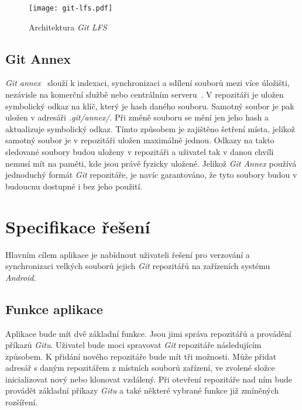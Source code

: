 \begin{figure}[h!]
    \begin{minipage}{\textwidth}
    \centering
    \vspace{0.5cm}
    \texttt{[image: git-lfs.pdf]}
    \caption{Architektura \emph{Git LFS}~\cite{git-lfs}}
    \label{diagram:git-lfs}
    \end{minipage}
\end{figure}

\section{Git Annex}
\emph{Git annex}~\cite{git-annex} slouží k indexaci, synchronizaci a sdílení souborů mezi více úložišti, nezávisle na komerční službě nebo centrálním serveru~\cite{wiki-git-annex}. V repozitáři je uložen symbolický odkaz na klíč, který je hash daného souboru. Samotný soubor je pak uložen v adresáři \emph{.git/annex/}. Při změně souboru se mění jen jeho hash a aktualizuje symbolický odkaz. Tímto způsobem je zajištěno šetření místa, jelikož samotný soubor je v repozitáři uložen maximálně jednou. Odkazy na takto sledované soubory budou uloženy v repozitáři a uživatel tak v danou chvíli nemusí mít na paměti, kde jsou právě fyzicky uložené. Jelikož \emph{Git Annex} používá jednoduchý formát \emph{Git} repozitáře, je navíc garantováno, že tyto soubory budou v budoucnu dostupné i bez jeho použití.

\chapter{Specifikace řešení}
Hlavním cílem aplikace je nabídnout uživateli řešení pro verzování a synchronizaci velkých souborů jejich \emph{Git} repozitářů na zařízeních systému \emph{Android}.

\section{Funkce aplikace}
Aplikace bude mít dvě základní funkce. Jsou jimi správa repozitářů a provádění příkazů \emph{Gitu}. Uživatel bude moci spravovat \emph{Git} repozitáře následujícím způsobem. K přidání nového repozitáře bude mít tři možnosti. Může přidat adresář s daným repozitářem z místních souborů zařízení, ve zvolené složce inicializovat nový nebo klonovat vzdálený. Při otevření repozitáře nad ním bude provádět základní příkazy \emph{Gitu} a také některé vybrané funkce již zmíněných rozšíření.

